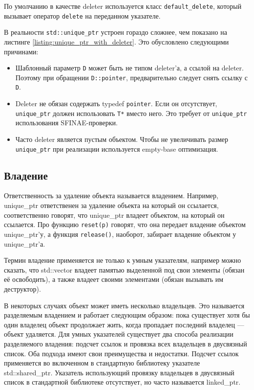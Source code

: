 По умолчанию в качестве deleter используется класс \texttt{default_delete}, который вызывает оператор \texttt{delete} на переданном указателе.

В реальности \texttt{std::unique_ptr} устроен гораздо сложнее, чем показано на листинге \ref{listing:unique_ptr_with_deleter}. Это обусловлено следующими причинами:

\begin{itemize}
    \item Шаблонный параметр \texttt{D} может быть не типом deleter'а, а ссылой на deleter. Поэтому при обращении \texttt{D::pointer}, предварительно следует снять ссылку с \texttt{D}.
    \item Deleter не обязан содержать typedef \texttt{pointer}. Если он отсутствует, \texttt{unique_ptr} должен использовать \texttt{T*} вместо него. Это требует от \texttt{unique_ptr} использования SFINAE-проверки.
    \item Часто deleter является пустым объектом. Чтобы не увеличивать размер \texttt{unique_ptr} при реализации используется empty-base оптимизация.
\end{itemize}

\subsection{Владение}
Ответственность за удаление объекта называется владением. Например, unique\_ptr ответственен за удаление объекта на который он ссылается, соответственно говорят, что unique\_ptr владеет объектом, на который он ссылается. Про функцию \texttt{reset(p)} говорят, что она передает владение объектом unique\_ptr'у, а функция \texttt{release()}, наоборот, забирает владение объектом у unique\_ptr'а.

Термин владение применяется не только к умным указателям, например можно сказать, что std::vector владеет памятью выделенной под свои элементы (обязан её освободить), а также владеет своими элементами (обязан вызывать им деструктор).

В некоторых случаях объект может иметь несколько владельцев. Это называется разделяемым владением и работает следующим образом: пока существует хотя бы один владелец объект продолжает жить, когда пропадает последний владелец --- объект удаляется. Для умных указателей существует два способа реализации разделяемого владения: подсчет ссылок и провязка всех владельцев в двусвязный список. Оба подхода имеют свои преимущества и недостатки. Подсчет ссылок применяется во включенном в стандартную библиотеку указателе std::shared\_ptr. Указатель использующий провязку владельцев в двусвязный список в стандартной библиотеке отсутствует, но часто называется linked\_ptr.
